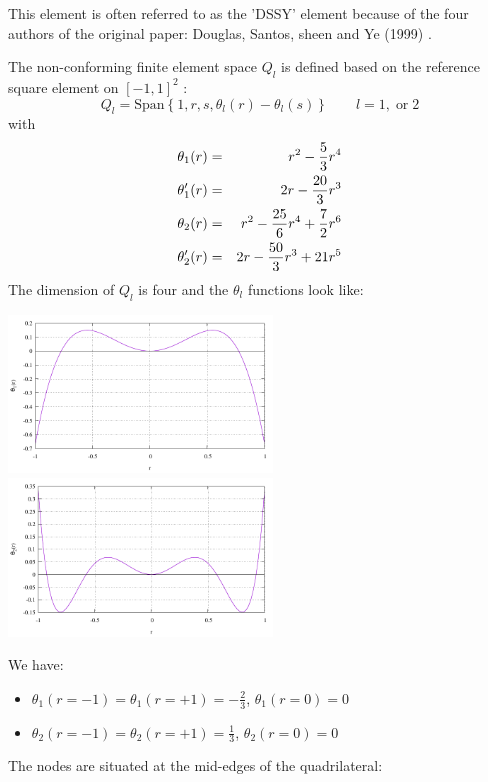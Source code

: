 This element is often referred to as the 'DSSY' element because of the 
four authors of the original paper: Douglas, Santos, sheen and Ye (1999) \cite{doss99}.

The non-conforming finite element space $Q_l$ is defined based on the 
reference square element on $[-1,1]^2$ :
\[
Q_l = \text{Span} \left\{ 1, r, s, \theta_l(r)-\theta_l(s)  \right\}
\qquad l=1,\; \text{or} \; 2
\]
with
\begin{eqnarray}
\theta_1(r)  &=& r^2-\frac53r^4  \nonumber\\
\theta_1'(r) &=& 2r-\frac{20}{3}r^3  \nonumber\\
\theta_2(r)  &=& r^2-\frac{25}{6} r^4 + \frac72 r^6 \\ 
\theta_2'(r) &=& 2r-\frac{50}{3} r^3 + 21 r^5
\end{eqnarray}
The dimension of $Q_l$ is four and the $\theta_l$ functions look like:
\begin{center}
\includegraphics[width=7cm]{images/dssy/theta1}
\includegraphics[width=7cm]{images/dssy/theta2}
\end{center}
We have:
\begin{itemize}
\item $\theta_1(r=-1)=\theta_1(r=+1)=-\frac23$, $\theta_1(r=0)=0$ 
\item $\theta_2(r=-1)=\theta_2(r=+1)=\frac13$, $\theta_2(r=0)=0$ 
\end{itemize}
The nodes are situated at the mid-edges of the quadrilateral:



